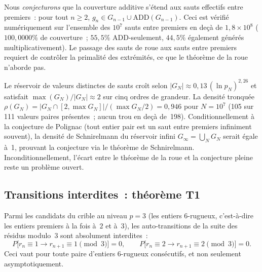 \documentclass[12pt,a4paper]{article}
\begin{document}
\begin{remarque}
\label{rem:coverage_conjecture}
Nous \emph{conjecturons} que la couverture additive s'étend aux sauts
effectifs entre premiers~: pour tout $n \geq 2$,
$g_n \in G_{n-1} \cup \mathrm{ADD}(G_{n-1})$.
Ceci est vérifié numériquement sur l'ensemble des $10^7$ sauts entre
premiers en deçà de $1{,}8 \times 10^8$ ($100{,}0000\%$ de couverture~;
$55{,}5\%$ ADD-seulement, $44{,}5\%$ également générés
multiplicativement). Le passage des sauts de roue aux sauts entre
premiers requiert de contrôler la primalité des extrémités, ce que le
théorème de la roue n'aborde pas.

Le réservoir de valeurs distinctes de sauts croît selon
$|G_N| \approx 0{,}13\, (\ln p_N)^{2{,}26}$ et satisfait
$\max(G_N) / |G_N| \approx 2$ sur cinq ordres de grandeur.
La densité tronquée $\rho(G_N) = |G_N \cap [2, \max G_N]| / (\max G_N / 2) = 0{,}946$
pour $N = 10^7$ (105 sur 111 valeurs paires présentes~; aucun trou en
deçà de~198). Conditionnellement à la conjecture de Polignac (tout
entier pair est un saut entre premiers infiniment souvent), la
densité de Schnirelmann du réservoir infini
$G_\infty = \bigcup_N G_N$ serait égale à~1, prouvant la conjecture
via le théorème de Schnirelmann. Inconditionnellement, l'écart entre
le théorème de la roue et la conjecture pleine reste un problème
ouvert.
\end{remarque}

\subsection{Transitions interdites~: théorème T1}
\label{sec:T1}

\mTHM
\begin{theoreme}
\label{thm:T1}
Parmi les candidats du crible au niveau $p = 3$ (les entiers
$6$-rugueux, c'est-à-dire les entiers premiers à la fois à~$2$ et
à~$3$), les auto-transitions de la suite des résidus modulo~$3$ sont
absolument interdites~:
\begin{equation}
  P\bigl[r_n \equiv 1 \to r_{n+1} \equiv 1 \pmod{3}\bigr] = 0, \qquad
  P\bigl[r_n \equiv 2 \to r_{n+1} \equiv 2 \pmod{3}\bigr] = 0.
  \label{eq:T1}
\end{equation}
Ceci vaut pour toute paire d'entiers $6$-rugueux consécutifs, et non
seulement asymptotiquement.
\end{theoreme}
\end{document}
